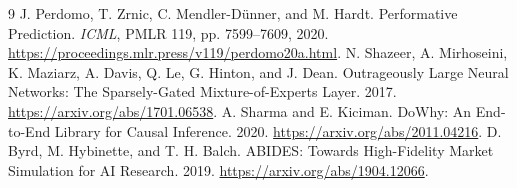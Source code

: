 \begin{thebibliography}{9}
 J. Perdomo, T. Zrnic, C. Mendler-D\"unner, and M. Hardt. Performative Prediction. \emph{ICML}, PMLR 119, pp. 7599--7609, 2020. \url{https://proceedings.mlr.press/v119/perdomo20a.html}.
 N. Shazeer, A. Mirhoseini, K. Maziarz, A. Davis, Q. Le, G. Hinton, and J. Dean. Outrageously Large Neural Networks: The Sparsely-Gated Mixture-of-Experts Layer. 2017. \url{https://arxiv.org/abs/1701.06538}.
 A. Sharma and E. Kiciman. DoWhy: An End-to-End Library for Causal Inference. 2020. \url{https://arxiv.org/abs/2011.04216}.
 D. Byrd, M. Hybinette, and T. H. Balch. ABIDES: Towards High-Fidelity Market Simulation for AI Research. 2019. \url{https://arxiv.org/abs/1904.12066}.

\end{thebibliography}


